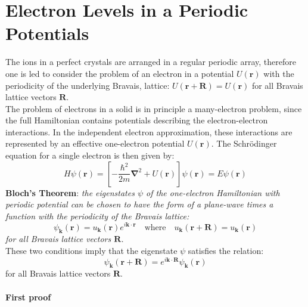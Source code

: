 \documentclass[10.75pt,a4paper,openright,bottom=2cm]{article}
\renewcommand{\Vec}[1]{\boldsymbol{#1}}
\begin{document}
\section{Electron Levels in a Periodic Potentials}
The ions in a perfect crystals are arranged in a regular periodic array, therefore one is led to consider the problem of an electron in a potential $U(\Vec{r})$ with the periodicity of the underlying Bravais, lattice: $U(\Vec{r}+\Vec{R})=U(\Vec{r})$ for all Bravais lattice vectors $\Vec{R}$.\\
The problem of electrons in a solid is in principle a many-electron problem, since the full Hamiltonian contains potentials describing the electron-electron interactions. In the independent electron approximation, these interactions are represented by an effective one-electron potential $U(\Vec{r})$. The Schr\"odinger equation for a single electron is then given by:
\[
H\psi(\Vec{r})=\left[-\frac{\hbar^2}{2m}\Vec{\nabla}^2+U(\Vec{r})\right]\psi(\Vec{r})=E\psi(\Vec{r})
\]
\textbf{Bloch's Theorem}: \textit{the eigenstates $\psi$ of the one-electron Hamiltonian with periodic potential can be chosen to have the form of a plane-wave times a function with the periodicity of the Bravais lattice:}
\[
\psi_{\Vec{k}}(\Vec{r})=u_{\Vec{k}}(\Vec{r})e^{i\Vec{k}\cdot\Vec{r}} \quad \text{where} \quad u_{\Vec{k}}(\Vec{r}+\Vec{R})=u_{\Vec{k}}(\Vec{r})
\]
\textit{for all Bravais lattice vectors $\Vec{R}$.}\\
These two conditions imply that the eigenstate $\psi$ satisfies the relation:
\[
\psi_{\Vec{k}}(\Vec{r}+\Vec{R})=e^{i\Vec{k}\cdot\Vec{R}}\psi_{\Vec{k}}(\Vec{r})
\]
for all Bravais lattice vectors $\Vec{R}$.\\\\
\textbf{First proof}
\end{document}

